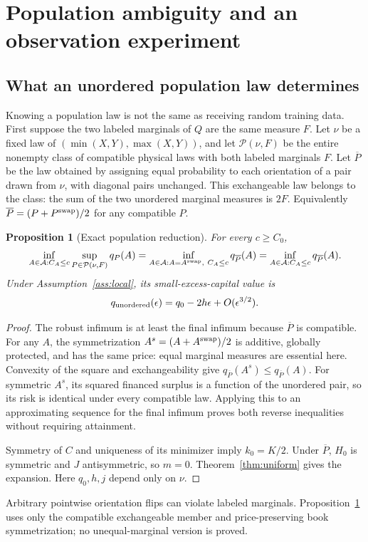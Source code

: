\documentclass[11pt,a4paper]{amsart}
\theoremstyle{plain}
\newtheorem{proposition}[theorem]{Proposition}
\theoremstyle{definition}
\theoremstyle{remark}
\newcommand{\calA}{\mathcal{A}}
\newcommand{\calP}{\mathcal{P}}
\begin{document}
\section{Population ambiguity and an observation experiment}\label{sec:information}

\subsection{What an unordered population law determines}
Knowing a population law is not the same as receiving random training data. First suppose the two labeled marginals of $Q$ are the same measure $F$. Let $\nu$ be a fixed law of $(\min(X,Y),\max(X,Y))$, and let $\calP(\nu,F)$ be the entire nonempty class of compatible physical laws with both labeled marginals $F$. Let $\overline P$ be the law obtained by assigning equal probability to each orientation of a pair drawn from $\nu$, with diagonal pairs unchanged. This exchangeable law belongs to the class: the sum of the two unordered marginal measures is $2F$. Equivalently $\overline P=(P+P^{\rm swap})/2$ for any compatible $P$.

\begin{proposition}[Exact population reduction]\label{prop:unordered}
For every $c\ge C_0$,
\begin{equation}\label{eq:unordered}
 \inf_{A\in\calA:C_A\le c}\sup_{P\in\calP(\nu,F)}q_P(A)
 =\inf_{A\in\calA:A=A^{\rm swap},\ C_A\le c}q_{\overline P}(A)
 =\inf_{A\in\calA:C_A\le c}q_{\overline P}(A).
\end{equation}
Under Assumption~\ref{ass:local}, its small-excess-capital value is
\[
 q_{\rm unordered}(\epsilon)=q_0-2h\epsilon+O(\epsilon^{3/2}).
\]
\end{proposition}
\begin{proof}
The robust infimum is at least the final infimum because $\overline P$ is compatible. For any $A$, the symmetrization $A^s=(A+A^{\rm swap})/2$ is additive, globally protected, and has the same price: equal marginal measures are essential here. Convexity of the square and exchangeability give $q_{\overline P}(A^s)\le q_{\overline P}(A)$. For symmetric $A^s$, its squared financed surplus is a function of the unordered pair, so its risk is identical under every compatible law. Applying this to an approximating sequence for the final infimum proves both reverse inequalities without requiring attainment.

Symmetry of $C$ and uniqueness of its minimizer imply $k_0=K/2$. Under $\overline P$, $H_0$ is symmetric and $J$ antisymmetric, so $m=0$. Theorem~\ref{thm:uniform} gives the expansion. Here $q_0,h,j$ depend only on $\nu$.
\end{proof}
Arbitrary pointwise orientation flips can violate labeled marginals. Proposition~\ref{prop:unordered} uses only the compatible exchangeable member and price-preserving book symmetrization; no unequal-marginal version is proved.
\end{document}

